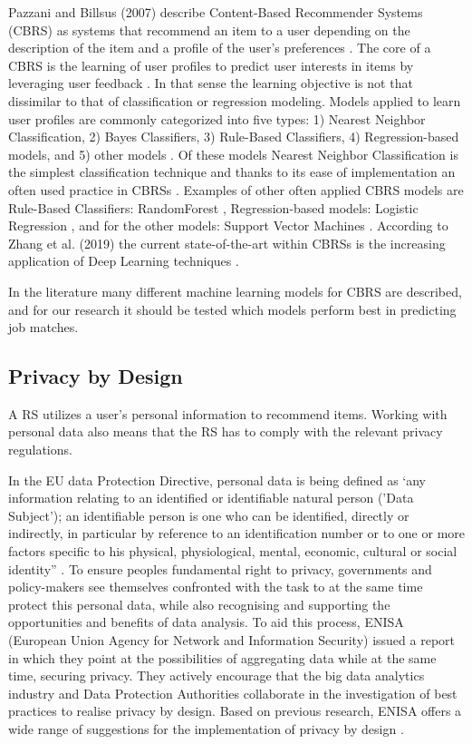 Pazzani and Billsus (2007) describe Content-Based Recommender Systems (CBRS) as systems that recommend an item to a user depending on the description of the item and a profile of the user’s preferences \cite{pazzani2007content}.
The core of a CBRS is the learning of user profiles to predict user interests in items by leveraging user feedback \cite{aggarwal2016content}.
In that sense the learning objective is not that dissimilar to that of classification or regression modeling.
Models applied to learn user profiles are commonly categorized into five types: 1) Nearest Neighbor Classification, 2) Bayes Classifiers, 3) Rule-Based Classifiers, 4) Regression-based models, and 5) other models \cite{aggarwal2016content, pazzani2007content}.
Of these models Nearest Neighbor Classification is the simplest classification technique and thanks to its ease of implementation an often used practice in CBRSs \cite{balabanovic1997fab}.
Examples of other often applied CBRS models  are Rule-Based Classifiers: RandomForest  \cite{zhang2016three, breiman2001random}, Regression-based models: Logistic Regression \cite{aggarwal2016content, hosmer2013applied}, and for the other models: Support Vector Machines \cite{aggarwal2016content, burges1998tutorial}.
According to Zhang et al. (2019) the current state-of-the-art within CBRSs is the increasing application of Deep Learning techniques \cite{zhang2019deep}.

In the literature many different machine learning models for CBRS are described, and for our research it should be tested which models perform best in predicting job matches.


\subsection{Privacy by Design}
\label{sec:pbd}
A RS utilizes a user’s personal information to recommend items.
Working with personal data also means that the RS has to comply with the relevant privacy regulations.

In the EU data Protection Directive, personal data is being defined as ‘any information relating to an identified or identifiable natural person ('Data Subject'); an identifiable person is one who can be identified, directly or indirectly, in particular by reference to an identification number or to one or more factors specific to his physical, physiological, mental, economic, cultural or social identity” \cite{european_data_protection}. 
To ensure peoples fundamental right to privacy, governments and policy-makers see themselves confronted with the task to at the same time protect this personal data, while also recognising and supporting the opportunities and benefits of data analysis.
To aid this process, ENISA (European Union Agency for Network and Information Security) issued a report in which they point at the possibilities of aggregating data while at the same time, securing privacy. 
They actively encourage that the big data analytics industry and Data Protection Authorities collaborate in the investigation of best practices to realise privacy by design. 
Based on previous research, ENISA offers a wide range of suggestions for the implementation of privacy by design \cite{d2015privacy}.

